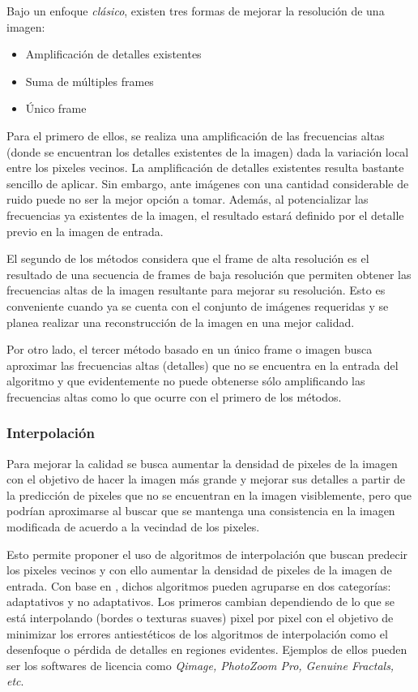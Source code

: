 \noindent
Bajo un enfoque \emph{clásico}, existen tres formas de mejorar la resolución 
de una imagen:

\begin{itemize}
    \item Amplificación de detalles existentes
    \item Suma de múltiples frames
    \item Único frame
\end{itemize}

Para el primero de ellos, se realiza una amplificación de las frecuencias altas
(donde se encuentran los detalles existentes de la imagen) dada la variación local
entre los pixeles vecinos. 
La amplificación de detalles existentes resulta bastante 
sencillo de aplicar. Sin embargo, ante imágenes con una cantidad considerable de
ruido puede no ser la mejor opción a tomar. Además, al potencializar las 
frecuencias ya existentes de la imagen, el resultado estará definido por el detalle
previo en la imagen de entrada. 

El segundo de los métodos considera que el frame de alta resolución es el resultado
de una secuencia de frames de baja resolución que permiten obtener las frecuencias 
altas de la imagen resultante para mejorar su resolución. Esto es conveniente cuando
ya se cuenta con el conjunto de imágenes requeridas y se planea realizar una 
reconstrucción de la imagen en una mejor calidad.

Por otro lado, el tercer método basado en un único frame o imagen busca aproximar las
frecuencias altas (detalles) que no se encuentra en la entrada del algoritmo y que evidentemente
no puede obtenerse sólo amplificando las frecuencias altas como lo que ocurre con 
el primero de los métodos. 

\subsubsection{Interpolación}
\noindent
Para mejorar la calidad se busca aumentar la densidad de pixeles de la imagen con el objetivo
de hacer la imagen más grande y mejorar sus detalles a partir de la predicción de 
pixeles que no se encuentran en la imagen visiblemente, pero que podrían aproximarse
al buscar que se mantenga una consistencia en la imagen modificada de acuerdo a la
vecindad de los pixeles. 

Esto permite proponer el uso de algoritmos de interpolación que buscan predecir los 
pixeles vecinos y con ello aumentar la densidad de pixeles de la imagen de entrada. 
Con base en \cite{interpolation_cambridge}, dichos algoritmos pueden agruparse en dos categorías: adaptativos y no adaptativos.
Los primeros cambian dependiendo de lo que se está interpolando (bordes o texturas 
suaves) pixel por pixel con el objetivo de minimizar los errores antiestéticos
de los algoritmos de interpolación como el desenfoque o pérdida de detalles en 
regiones evidentes. Ejemplos de ellos pueden ser los softwares de licencia como
\emph{Qimage, PhotoZoom Pro, Genuine Fractals, etc}. 

